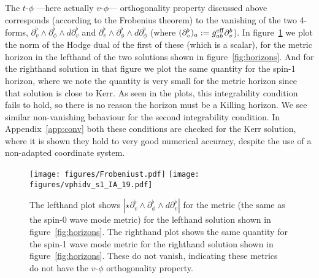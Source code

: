 \documentclass[12pt]{article}
\numberwithin{equation}{section}
\begin{document}
The $t$-$\phi$ ---here actually $v$-$\phi$--- orthogonality property
discussed above corresponds (according to the Frobenius theorem) to the vanishing of the two 4-forms,
$\partial_v^\flat\wedge \partial_\phi^\flat\wedge d\partial_v^\flat$
and $\partial_v^\flat\wedge \partial_\phi^\flat\wedge d\partial_\phi^\flat$
(where $(\partial_v^\flat)_a:=g^{\rm eff}_{ab}\partial_v^b$).
In figure~\ref{fig:integ} we plot the norm of the Hodge dual of the first of these (which is a scalar), for the
metric horizon in the lefthand of the two solutions shown in figure~\ref{fig:horizons}. And for the righthand solution in that figure we plot the same quantity for the spin-1 horizon, where we note the quantity is very small for the metric horizon since that solution is close to Kerr.
As seen in the plots, this integrability condition
fails to hold, so there is no reason the horizon must
be a Killing horizon. 
We see similar non-vanishing behaviour for the second integrability condition.
In Appendix~\ref{app:conv} both these conditions
are checked for the Kerr solution, where it is shown they hold to very good numerical accuracy, despite the use of a non-adapted coordinate system.


\begin{figure}
\centerline{ 
  \texttt{[image: figures/Frobeniust.pdf]}
  \hspace{0.1cm}
  \texttt{[image: figures/vphidv\_s1\_IA\_19.pdf]}
  \hspace{0.1cm}
  }
  \caption{\label{fig:integ} 
  The lefthand plot shows $|\star \partial_v^\flat\wedge \partial_\phi^\flat\wedge d\partial_v^\flat|$
  for the metric (the same as the spin-0 wave mode metric) for the lefthand solution shown in  figure~\ref{fig:horizons}. The righthand plot shows the same quantity for the spin-1 wave mode metric for the righthand solution shown in  figure~\ref{fig:horizons}.
  These do not vanish, indicating these metrics do not have the $v$-$\phi$ orthogonality property.
  }
\end{figure}
\end{document}
